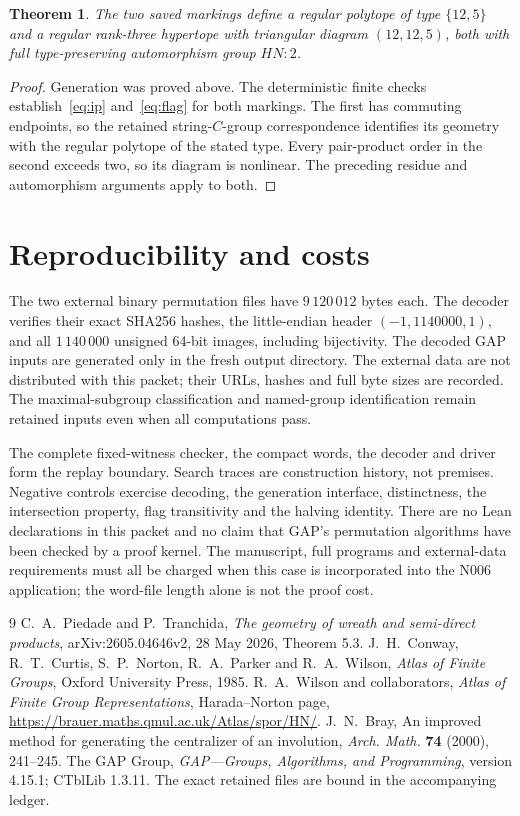 \documentclass[11pt]{article}
\newtheorem{theorem}{Theorem}
\begin{document}
\begin{theorem}
The two saved markings define a regular polytope of type $\{12,5\}$ and a regular rank-three hypertope with triangular diagram $(12,12,5)$, both with full type-preserving automorphism group $HN:2$.
\end{theorem}
\begin{proof}
Generation was proved above. The deterministic finite checks establish~\eqref{eq:ip} and~\eqref{eq:flag} for both markings. The first has commuting endpoints, so the retained string-$C$-group correspondence identifies its geometry with the regular polytope of the stated type. Every pair-product order in the second exceeds two, so its diagram is nonlinear. The preceding residue and automorphism arguments apply to both.
\end{proof}
\section{Reproducibility and costs}
The two external binary permutation files have $9\,120\,012$ bytes each. The decoder verifies their exact SHA256 hashes, the little-endian header $(-1,1140000,1)$, and all $1\,140\,000$ unsigned 64-bit images, including bijectivity. The decoded GAP inputs are generated only in the fresh output directory. The external data are not distributed with this packet; their URLs, hashes and full byte sizes are recorded. The maximal-subgroup classification and named-group identification remain retained inputs even when all computations pass.

The complete fixed-witness checker, the compact words, the decoder and driver form the replay boundary. Search traces are construction history, not premises. Negative controls exercise decoding, the generation interface, distinctness, the intersection property, flag transitivity and the halving identity. There are no Lean declarations in this packet and no claim that GAP's permutation algorithms have been checked by a proof kernel. The manuscript, full programs and external-data requirements must all be charged when this case is incorporated into the N006 application; the word-file length alone is not the proof cost.
\begin{thebibliography}{9}
 C.~A.~Piedade and P.~Tranchida, \emph{The geometry of wreath and semi-direct products}, arXiv:2605.04646v2, 28 May 2026, Theorem 5.3.
 J.~H.~Conway, R.~T.~Curtis, S.~P.~Norton, R.~A.~Parker and R.~A.~Wilson, \emph{Atlas of Finite Groups}, Oxford University Press, 1985.
 R.~A.~Wilson and collaborators, \emph{Atlas of Finite Group Representations}, Harada--Norton page, \url{https://brauer.maths.qmul.ac.uk/Atlas/spor/HN/}.
 J.~N.~Bray, An improved method for generating the centralizer of an involution, \emph{Arch. Math.} \textbf{74} (2000), 241--245.
 The GAP Group, \emph{GAP---Groups, Algorithms, and Programming}, version 4.15.1; CTblLib 1.3.11. The exact retained files are bound in the accompanying ledger.
\end{thebibliography}
\end{document}

